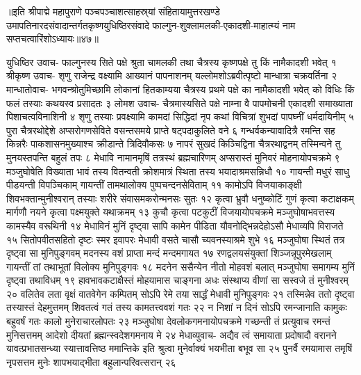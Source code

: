 ॥इति श्रीपाद्मे महापुराणे पञ्चपञ्चाशत्साहस्र्यां संहितायामुत्तरखण्डे उमापतिनारदसंवादान्तर्गतकृष्णयुधिष्ठिरसंवादे फाल्गुन-शुक्लामलकी-एकादशी-माहात्म्यं नाम सप्तचत्वारिंशोऽध्यायः॥४७॥



युधिष्ठिर उवाच-
फाल्गुनस्य सिते पक्षे श्रुता चामलकी तथा 
चैत्रस्य कृष्णपक्षे तु किं नामैकादशी भवेत् १
श्रीकृष्ण उवाच-
शृणु राजेन्द्र वक्ष्यामि आख्यानं पापनाशनम् 
यल्लोमशोऽब्रवीत्पृष्टो मान्धात्रा चक्रवर्तिना २
मान्धातोवाच-
भगवन्श्रोतुमिच्छामि लोकानां हितकाम्यया 
चैत्रस्य प्रथमे पक्षे का नामैकादशी भवेत् 
को विधिः किं फलं तस्याः कथयस्व प्रसादतः ३
लोमश उवाच-
चैत्रमास्यसिते पक्षे नाम्ना वै पापमोचनी 
एकादशी समाख्याता पिशाचत्वविनाशिनी ४
शृणु तस्याः प्रवक्ष्यामि कामदां सिद्धिदां नृप 
कथां विचित्रां शुभदां पापघ्नीं धर्मदायिनीम् ५
पुरा चैत्ररथोद्देशे अप्सरोगणसेविते 
वसन्तसमये प्राप्ते षट्पदाकुलिते वने ६
गन्धर्वकन्यावादित्रै रमन्ति सह किन्नरैः 
पाकशासनमुख्याश्च क्रीडान्ते त्रिदिवौकसः ७
नापरं सुखदं किञ्चिद्विना चैत्ररथाद्वनम् 
तस्मिन्वने तु मुनयस्तपन्ति बहुलं तपः ८
मेधावि नामानमृषिं तत्रस्थं ब्रह्मचारिणम् 
अप्सरास्तं मुनिवरं मोहनायोपचक्रमे ९
मञ्जुघोषेति विख्याता भावं तस्य वितन्वती 
क्रोशमात्रं स्थिता तस्य भयादाश्रमसन्निधौ १०
गायन्ती मधुरं साधु पीडयन्ती विपञ्चिकाम् 
गायन्तीं तामथालोक्य पुष्पचन्दनसेविताम् ११
कामोऽपि विजयाकाङ्क्षी शिवभक्तान्मुनीश्वरान् 
तस्याः शरीरे संवासमकरोन्मनसः सुतः १२
कृत्वा भ्रुवौ धनुष्कोटिं गुणं कृत्वा कटाक्षकम् 
मार्गणौ नयने कृत्वा पक्ष्मयुक्ते यथाक्रमम् १३
कुचौ कृत्वा पटकुटीं विजयायोपचक्रमे 
मञ्जुघोषाभवत्तस्य कामस्यैव वरूथिनी १४
मेधाविनं मुनिं दृष्ट्वा सापि कामेन पीडिता 
यौवनोद्भिन्नदेहोऽसौ मेधाव्यपि विराजते १५
सितोपवीतसहितो दृष्टः स्मर इवापरः 
मेधावी वसते चासौ च्यवनस्याश्रमे शुभे १६
मञ्जुघोषा स्थितं तत्र दृष्ट्वा सा मुनिपुङ्गवम् 
मदनस्य वशं प्राप्ता मन्दं मन्दमगायत १७
रणद्वलयसंयुक्तां शिञ्जन्नूपुरमेखलाम् 
गायन्तीं तां तथाभूतां विलोक्य मुनिपुङ्गवः १८
मदनेन ससैन्येन नीतो मोहवशं बलात् 
मञ्जुघोषा समागम्य मुनिं दृष्ट्वा तथाविधम् १९
हावभावकटाक्षैस्तं मोहयामास चाङ्गना 
अधः संस्थाप्य वीणां सा सस्वजे तं मुनीश्वरम् २०
वलितेव लता वृक्षं वातवेगेन कम्पितम् 
सोऽपि रेमे तया सार्द्धं मेधावी मुनिपुङ्गवः २१
तस्मिन्नेव ततो दृष्ट्वा तस्यास्तं देहमुत्तमम् 
शिवतत्वं गतं तस्य कामतत्त्ववशं गतः २२
न निशां न दिनं सोऽपि रमन्जानाति कामुकः 
बहुवर्षं गतः कालो मुनेराचारलोपतः २३
मञ्जुघोषा देवलोकगमनायोपचक्रमे 
गच्छन्ती तं प्रत्युवाच रमन्तं मुनिसत्तमम् 
आदेशो दीयतां ब्रह्मन्स्वदेशगमनाय मे २४
मेधाव्युवाच-
अद्यैव त्वं समायाता प्रदोषादौ वरानने 
यावत्प्रभातसन्ध्या स्यात्तावत्तिष्ठ ममान्तिके 
इति श्रुत्वा मुनेर्वाक्यं भयभीता बभूव सा २५
पुनर्वै रमयामास तमृषिं नृपसत्तम 
मुनेः शापभयाद्भीता बहुलान्परिवत्सरान् २६
